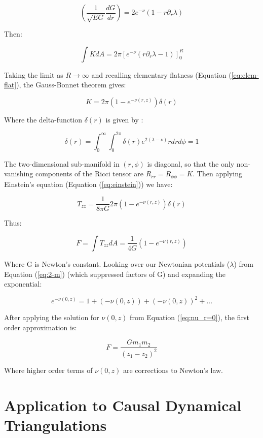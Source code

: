 \documentclass{article}
\begin{document}
\begin{equation}
\left(\frac{1}{\sqrt{EG}}\frac{dG}{dr}\right)=2e^{-\nu}\left(1-r\partial_{r}\lambda\right)
\end{equation}

Then:

\begin{equation}
\int KdA=2\pi[e^{-\nu}\left(r\partial_{r}\lambda-1\right)]^{R}_{0}
\end{equation}

Taking the limit as $R\rightarrow\infty$ and recalling elementary flatness (Equation (\ref{eq:elem-flat}), the Gauss-Bonnet theorem gives:

\begin{equation}
K=2\pi\left(1-e^{-\nu (r,z)}\right)\delta(r)
\end{equation}

Where the delta-function $\delta(r)$ is given by \cite{araujo_static_1995}:

\begin{equation}
\delta(r)=\int^{\infty}_{0} \int^{2\pi}_{0} \delta (r)e^{2\left(\lambda-\nu\right)}rdrd\phi =1
\end{equation} 

The two-dimensional sub-manifold in $\left(r,\phi\right)$ is diagonal, so that the only non-vanishing components of the Ricci tensor are $R_{rr}=R_{\phi\phi}=K$. Then applying Einstein's equation (Equation (\ref{eq:einstein})) we have:

\begin{equation}
T_{zz}=\frac{1}{8\pi G}2\pi\left(1-e^{-\nu (r,z)}\right)\delta(r)
\end{equation} 

Thus:

\begin{equation}
F=\int T_{zz}dA=\frac{1}{4G}\left(1-e^{-\nu (r,z)}\right)
\end{equation}

Where G is Newton's constant. Looking over our Newtonian potentials ($\lambda$) from Equation (\ref{eq:2-m}) (which suppressed factors of G) and expanding the exponential:

\begin{equation}
e^{-\nu\left(0,z\right)}=1+\left(-\nu\left(0,z\right)\right)+\left(-\nu\left(0,z\right)\right)^{2}+...
\end{equation}

After applying the solution for $\nu(0,z)$ from Equation (\ref{eq:nu_r=0}), the first order approximation is:

\begin{equation}
F=\frac{Gm_{1}m_{2}}{\left(z_{1}-z_{2}\right)^{2}}
\end{equation}

Where higher order terms of $\nu\left(0,z\right)$ are corrections to Newton's law.

\section{Application to Causal Dynamical Triangulations}



\end{document}
